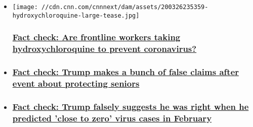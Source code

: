 \begin{itemize}
\item
  \href{/2020/05/20/politics/workers-taking-hydroxychloroquine-fact-check/index.html}{}

  \texttt{[image: //cdn.cnn.com/cnnnext/dam/assets/200326235359-hydroxychloroquine-large-tease.jpg]}

  \hypertarget{fact-check-are-frontline-workers-taking-hydroxychloroquine-to-prevent-coronavirus}{%
  \subsubsection{\texorpdfstring{\href{/2020/05/20/politics/workers-taking-hydroxychloroquine-fact-check/index.html}{Fact
  check: Are frontline workers taking hydroxychloroquine to prevent
  coronavirus?}}{Fact check: Are frontline workers taking hydroxychloroquine to prevent coronavirus?}}\label{fact-check-are-frontline-workers-taking-hydroxychloroquine-to-prevent-coronavirus}}
\item
  \hypertarget{fact-check-trump-makes-a-bunch-of-false-claims-after-event-about-protecting-seniors-}{%
  \subsubsection{\texorpdfstring{\href{/2020/04/30/politics/fact-check-trump-april-30/index.html}{Fact
  check: Trump makes a bunch of false claims after event about
  protecting seniors
  }}{Fact check: Trump makes a bunch of false claims after event about protecting seniors }}\label{fact-check-trump-makes-a-bunch-of-false-claims-after-event-about-protecting-seniors-}}
\item
  \hypertarget{fact-check-trump-falsely-suggests-he-was-right-when-he-predicted-close-to-zero-virus-cases-in-february}{%
  \subsubsection{\texorpdfstring{\href{/2020/04/28/politics/fact-check-trump-remarks-april-28/index.html}{Fact
  check: Trump falsely suggests he was right when he predicted 'close to
  zero' virus cases in
  February}}{Fact check: Trump falsely suggests he was right when he predicted 'close to zero' virus cases in February}}\label{fact-check-trump-falsely-suggests-he-was-right-when-he-predicted-close-to-zero-virus-cases-in-february}}
\end{itemize}

